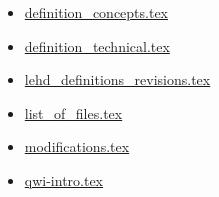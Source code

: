 \begin{itemize}
\item \href{definition_concepts.tex}{definition\_concepts.tex}
\item \href{definition_technical.tex}{definition\_technical.tex}
\item \href{lehd_definitions_revisions.tex}{lehd\_definitions\_revisions.tex}
\item \href{list_of_files.tex}{list\_of\_files.tex}
\item \href{modifications.tex}{modifications.tex}
\item \href{qwi-intro.tex}{qwi-intro.tex}
\end{itemize}

